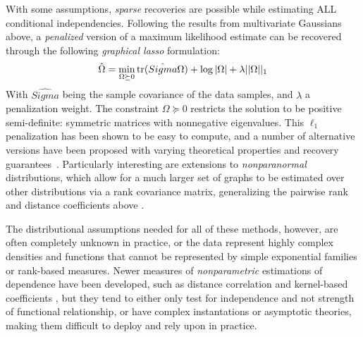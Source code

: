 With some assumptions, \textit{sparse} recoveries are possible while estimating ALL conditional independencies. Following the results from multivariate Gaussians above,
a \textit{penalized} version of a maximum likelihood estimate can be recovered through the following \textit{graphical lasso} \citep{friedman2008sparse} formulation:
\begin{align}\label{eq:glasso}
    \hat{\Omega} = \min_{\Omega \succeq 0} \operatorname{tr}(\hat{Sigma}\Omega) + \log|\Omega| + \lambda||\Omega||_1
\end{align}
With $\hat{Sigma}$ being the sample covariance of the data samples, and $\lambda$ a penalization weight. The constraint $\Omega \succeq 0$ restricts the solution to be positive semi-definite: symmetric matrices with nonnegative eigenvalues. This $\ell_1$ penalization has been shown to be easy to compute, and a number of alternative versions have been proposed with varying theoretical properties and recovery guarantees~\citep{cai2011constrained,yuan2010high}.
Particularly interesting are extensions to \textit{nonparanormal} distributions, which allow for a much larger set of graphs to be estimated over other distributions via a rank covariance matrix, generalizing the pairwise rank and distance coefficients above \citep{liu2009nonparanormal,xue2012regularized}.

The distributional assumptions needed for all of these methods, however, are often completely unknown in practice, or the data represent highly complex densities and functions that cannot be represented by simple exponential families or rank-based measures.
Newer measures of \textit{nonparametric} estimations of dependence have been developed, such as distance correlation and kernel-based coefficients \citep{szekely2014partial,wang2015conditional,doran2014permutation}, but they tend to either only test for independence and not strength of functional relationship, or have complex instantations or asymptotic theories, making them difficult to deploy and rely upon in practice.


